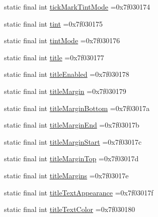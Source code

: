 \begin{DoxyCompactItemize}
static final int \mbox{\hyperlink{classbr_1_1unb_1_1cic_1_1mp_1_1marketmaster_1_1test_1_1R_1_1attr_a34482b87569280edad71fe283789754b}{tick\+Mark\+Tint\+Mode}} =0x7f030174
\item 
static final int \mbox{\hyperlink{classbr_1_1unb_1_1cic_1_1mp_1_1marketmaster_1_1test_1_1R_1_1attr_a6b4e4544deb81c32732f48949f52ca91}{tint}} =0x7f030175
\item 
static final int \mbox{\hyperlink{classbr_1_1unb_1_1cic_1_1mp_1_1marketmaster_1_1test_1_1R_1_1attr_a4912bb4b47a56fd1ba314861c3a5944c}{tint\+Mode}} =0x7f030176
\item 
static final int \mbox{\hyperlink{classbr_1_1unb_1_1cic_1_1mp_1_1marketmaster_1_1test_1_1R_1_1attr_aa56b6f146482158d82608de9fa0108f3}{title}} =0x7f030177
\item 
static final int \mbox{\hyperlink{classbr_1_1unb_1_1cic_1_1mp_1_1marketmaster_1_1test_1_1R_1_1attr_ac2ac85469503659548ccce2411ed203e}{title\+Enabled}} =0x7f030178
\item 
static final int \mbox{\hyperlink{classbr_1_1unb_1_1cic_1_1mp_1_1marketmaster_1_1test_1_1R_1_1attr_ab6ec0f26e63274bd513bb751c3ec3a3f}{title\+Margin}} =0x7f030179
\item 
static final int \mbox{\hyperlink{classbr_1_1unb_1_1cic_1_1mp_1_1marketmaster_1_1test_1_1R_1_1attr_ab69e5f00ee525157ebd21b581bc6e712}{title\+Margin\+Bottom}} =0x7f03017a
\item 
static final int \mbox{\hyperlink{classbr_1_1unb_1_1cic_1_1mp_1_1marketmaster_1_1test_1_1R_1_1attr_a3eacbd83f3788bbb9843be93861ecd5d}{title\+Margin\+End}} =0x7f03017b
\item 
static final int \mbox{\hyperlink{classbr_1_1unb_1_1cic_1_1mp_1_1marketmaster_1_1test_1_1R_1_1attr_aa88902b6f5a6374d363ad41a8db3d506}{title\+Margin\+Start}} =0x7f03017c
\item 
static final int \mbox{\hyperlink{classbr_1_1unb_1_1cic_1_1mp_1_1marketmaster_1_1test_1_1R_1_1attr_a10fa5664685145028f5b870ba95f61fa}{title\+Margin\+Top}} =0x7f03017d
\item 
static final int \mbox{\hyperlink{classbr_1_1unb_1_1cic_1_1mp_1_1marketmaster_1_1test_1_1R_1_1attr_a182205cca0a9f54114595e57cc23d795}{title\+Margins}} =0x7f03017e
\item 
static final int \mbox{\hyperlink{classbr_1_1unb_1_1cic_1_1mp_1_1marketmaster_1_1test_1_1R_1_1attr_aa60bb1ed0a4da2ddf4767b3addf5298e}{title\+Text\+Appearance}} =0x7f03017f
\item 
static final int \mbox{\hyperlink{classbr_1_1unb_1_1cic_1_1mp_1_1marketmaster_1_1test_1_1R_1_1attr_a471935e8af530e9cc3caa19d5b930ed8}{title\+Text\+Color}} =0x7f030180

\end{DoxyCompactItemize}
